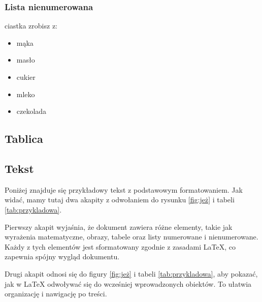 \subsubsection{Lista nienumerowana}
ciastka zrobisz z:
\begin{itemize}
    \item mąka
    \item masło
    \item cukier
    \item mleko
    \item czekolada
\end{itemize}

\subsection{Tablica}


\subsection{Tekst}
Poniżej znajduje się przykładowy tekst z podstawowym formatowaniem. Jak widać, mamy tutaj dwa akapity z odwołaniem do rysunku \ref{fig:jeż} i tabeli \ref{tab:przykladowa}.

Pierwszy akapit wyjaśnia, że dokument zawiera różne elementy, takie jak wyrażenia matematyczne, obrazy, tabele oraz listy numerowane i nienumerowane. Każdy z tych elementów jest sformatowany zgodnie z zasadami LaTeX, co zapewnia spójny wygląd dokumentu.

Drugi akapit odnosi się do figury \ref{fig:jeż} i tabeli \ref{tab:przykladowa}, aby pokazać, jak w LaTeX odwoływać się do wcześniej wprowadzonych obiektów. To ułatwia organizację i nawigację po treści.

% 

